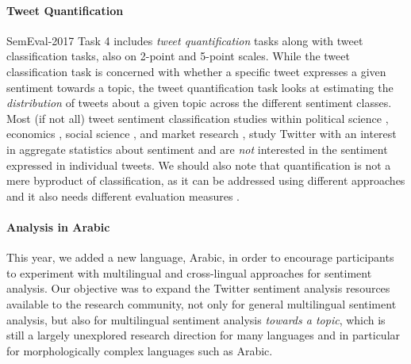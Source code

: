 \documentclass[11pt,a4paper]{article}
\begin{document}
\paragraph{Tweet Quantification} 
SemEval-2017 Task 4 includes \textit{tweet quantification} tasks along with tweet classification tasks, also on 2-point and 5-point scales. While the tweet classification task is concerned with whether a specific tweet expresses a given sentiment towards a topic, the tweet quantification task looks at estimating the \textit{distribution} of tweets about a given topic across the different sentiment classes. Most (if not all) tweet sentiment classification studies within political science
  \cite{Borge-Holthoefer:2015dz,Kaya:2013ca,marchettibowick-chambers:2012:EACL2012},
  economics \cite{Bollen:2011bf,OConnor:2010fk}, social science
  \cite{Dodds:2011uq}, and market research
  \cite{Burton:2011sh,Qureshi:2013fb}, study Twitter with an interest in aggregate statistics about sentiment and are \emph{not} interested in the sentiment expressed in individual tweets.
We should also note that quantification is not a mere byproduct of classification, as it can be addressed using different approaches and it also needs different evaluation measures  \cite{Forman:2008kx,Esuli:2015gh}.
  
\paragraph{Analysis in Arabic} 
This year, we added a new language, Arabic, in order to encourage participants to experiment with multilingual and cross-lingual approaches for sentiment analysis. Our objective was to expand the Twitter sentiment analysis resources available to the research community, not only for general multilingual sentiment analysis, but also for multilingual sentiment analysis \emph{towards a topic}, which is still a largely unexplored research direction for many languages and in particular for morphologically complex languages such as Arabic.
\end{document}
